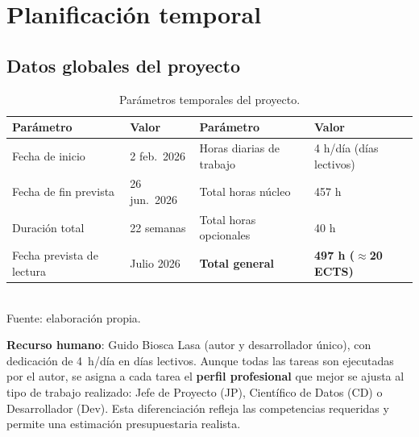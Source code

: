 \documentclass[11pt, a4paper]{article}
\begin{document}
\section{Planificación temporal}
\label{sec:planificacion}

\subsection{Datos globales del proyecto}

\begin{table}[H]
\centering
\caption{Parámetros temporales del proyecto.}
\label{tab:globales}
\small
\begin{tabular}{@{}ll@{\quad}ll@{}}
\toprule
\textbf{Parámetro}          & \textbf{Valor}        & \textbf{Parámetro}                  & \textbf{Valor} \\
\midrule
Fecha de inicio              & 2 feb.\ 2026          & Horas diarias de trabajo            & 4 h/día (días lectivos) \\
Fecha de fin prevista        & 26 jun.\ 2026         & Total horas núcleo                  & 457 h \\
Duración total               & 22 semanas            & Total horas opcionales              & 40 h \\
Fecha prevista de lectura    & Julio 2026            & \textbf{Total general}              & \textbf{497 h ($\approx$20 ECTS)} \\
\bottomrule
\end{tabular}
\\[0.15cm]{\small Fuente: elaboración propia.}
\end{table}

\textbf{Recurso humano}: Guido Biosca Lasa (autor y desarrollador único), con dedicación de 4~h/día en días lectivos. Aunque todas las tareas son ejecutadas por el autor, se asigna a cada tarea el \textbf{perfil profesional} que mejor se ajusta al tipo de trabajo realizado: Jefe de Proyecto (JP), Científico de Datos (CD) o Desarrollador (Dev). Esta diferenciación refleja las competencias requeridas y permite una estimación presupuestaria realista.
\end{document}
